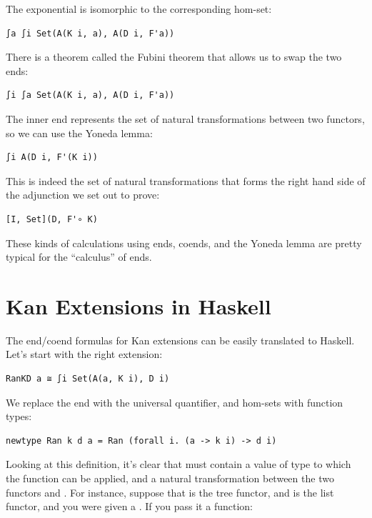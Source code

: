 The exponential is isomorphic to the corresponding hom-set:

\begin{verbatim}
∫a ∫i Set(A(K i, a), A(D i, F'a))
\end{verbatim}

There is a theorem called the Fubini theorem that allows us to swap the
two ends:

\begin{verbatim}
∫i ∫a Set(A(K i, a), A(D i, F'a))
\end{verbatim}

The inner end represents the set of natural transformations between two
functors, so we can use the Yoneda lemma:

\begin{verbatim}
∫i A(D i, F'(K i))
\end{verbatim}

This is indeed the set of natural transformations that forms the right
hand side of the adjunction we set out to prove:

\begin{verbatim}
[I, Set](D, F'∘ K)
\end{verbatim}

These kinds of calculations using ends, coends, and the Yoneda lemma are
pretty typical for the ``calculus'' of ends.

\section{Kan Extensions in Haskell}\label{kan-extensions-in-haskell}

The end/coend formulas for Kan extensions can be easily translated to
Haskell. Let's start with the right extension:

\begin{verbatim}
RanKD a ≅ ∫i Set(A(a, K i), D i)
\end{verbatim}

We replace the end with the universal quantifier, and hom-sets with
function types:

\begin{verbatim}
newtype Ran k d a = Ran (forall i. (a -> k i) -> d i)
\end{verbatim}

Looking at this definition, it's clear that  must contain a
value of type  to which the function can be applied, and a
natural transformation between the two functors  and
. For instance, suppose that  is the tree functor,
and  is the list functor, and you were given a
. If you pass it a function:

